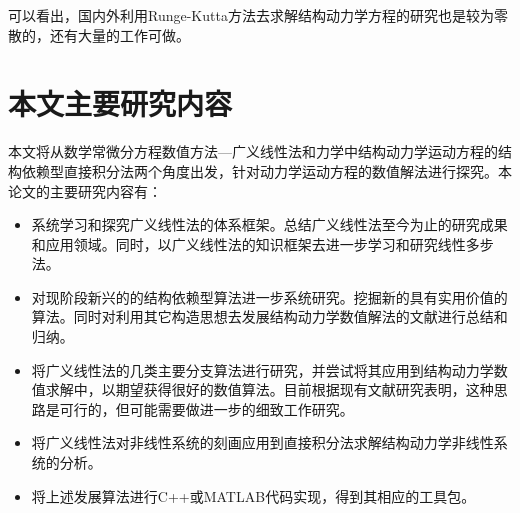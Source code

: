 可以看出，国内外利用Runge-Kutta方法去求解结构动力学方程的研究也是较为零散的，还有大量的工作可做。
\section{本文主要研究内容}
本文将从数学常微分方程数值方法—广义线性法和力学中结构动力学运动方程的结构依赖型直接积分法两个角度出发，针对动力学运动方程的数值解法进行探究。本论文的主要研究内容有：
\begin{itemize}
\item 系统学习和探究广义线性法的体系框架。总结广义线性法至今为止的研究成果和应用领域。同时，以广义线性法的知识框架去进一步学习和研究线性多步法。
\item 对现阶段新兴的的结构依赖型算法进一步系统研究。挖掘新的具有实用价值的算法。同时对利用其它构造思想去发展结构动力学数值解法的文献进行总结和归纳。
\item 将广义线性法的几类主要分支算法进行研究，并尝试将其应用到结构动力学数值求解中，以期望获得很好的数值算法。目前根据现有文献研究表明，这种思路是可行的，但可能需要做进一步的细致工作研究。
\item 将广义线性法对非线性系统的刻画应用到直接积分法求解结构动力学非线性系统的分析。
\item 将上述发展算法进行C++或MATLAB代码实现，得到其相应的工具包。
\end{itemize}

